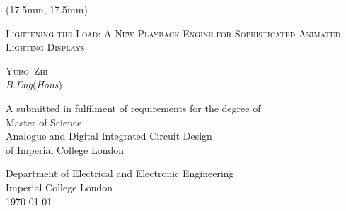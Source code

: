 \thispagestyle{empty}

\begin{center}
\null {}
\renewcommand{\baselinestretch}{2}

\begin{textblock*}{7cm}(17.5mm, 17.5mm)%
\end{textblock*}

{\huge \textsc{Lightening the Load: A New Playback Engine for Sophisticated Animated Lighting Displays} \par}

\textsc{\large\href{yz4116@imperial.ac.uk}{Yubo~Zhi}} \\
\textit{B.Eng}(\textit{Hons})\\

A  submitted in fulfilment of requirements for the degree of \\
Master of Science\\
Analogue and Digital Integrated Circuit Design\\
of Imperial College London


Department of Electrical and Electronic Engineering\\
Imperial College London\\
\today

\end{center}
